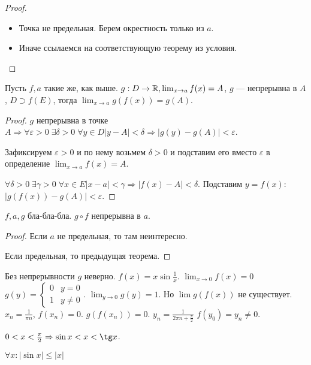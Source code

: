 \begin{proof}
    \slashn
    \begin{itemize}
        \item Точка не предельная. Берем окрестность только из $a$.
        \item Иначе ссылаемся на соответствующую теорему из условия.
    \end{itemize}
\end{proof}
\begin{theorem}
    Пусть $f, a$ такие же, как выше.  $g: D \to \mathbb{R}, \lim_{x \to a} f(x) = A$,  $g$ --- непрерывна в  $A$,  $D \supset f(E)$, тогда  $\lim_{x \to a} g(f(x)) = g(A)$.
\end{theorem}
\begin{proof}
    $g$ непрерывна в точке  $A \Rightarrow \forall \varepsilon > 0 \; \exists \delta > 0 \; \forall y \in D |y-A| < \delta \Rightarrow |g(y) - g(A)| < \varepsilon$. 

    Зафиксируем  $\varepsilon > 0$ и по нему возьмем  $\delta > 0$ и подставим его вместо  $\varepsilon$ в определение  $\lim_{x \to a} f(x) = A$. 

    $\forall \delta > 0 \; \exists \gamma > 0 \; \forall x \in E |x - a| < \gamma \Rightarrow |f(x)  - A| < \delta$. Подставим $y = f(x)$:  $|g(f(x)) - g(A)| < \varepsilon$.
\end{proof}
\begin{consequence}
    $f, a, g$ бла-бла-бла.  $g \circ f$ непрерывна в  $a$.
\end{consequence}
\begin{proof}
    Если $a$ не предельная, то там неинтересно.

    Если предельная, то предыдущая теорема.
\end{proof}
\begin{remark}
    Без непрерывности $g$ неверно.  $f(x) = x \sin \frac{1}{x}$. $\lim_{x \to 0} f(x) = 0$
    $g(y) = \begin{cases} 0 & y = 0 \\ 1 & y \neq 0\end{cases}$.  $\lim_{y \to 0} g(y) = 1$.  Но  $\lim g(f(x))$ не существует.  $x_n = \frac{1}{\pi n}$, $f(x_n) = 0$.  $g(f(x_n)) = 0$.  $y_n = \frac{1}{2\pi n + \frac{\pi}{2}}$ $f(y_0) = y_n \neq 0$.
\end{remark}
\begin{theorem}
    $0 < x < \frac{\pi}{2} \Rightarrow \sin x < x < \tg x$.
\end{theorem}
\begin{consequence}
    $\forall x: |\sin x| \le |x|$
\end{consequence}
